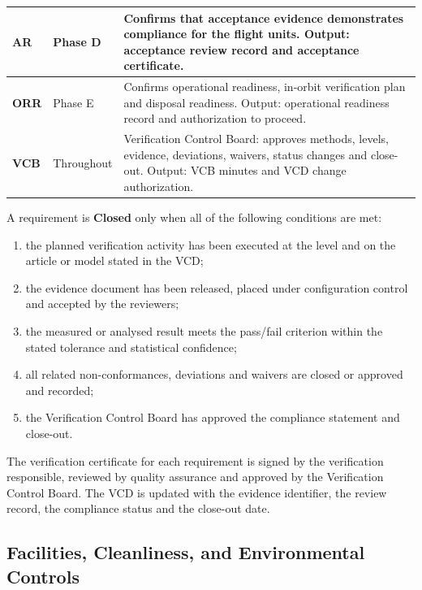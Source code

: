 \begin{table}[htbp]
{\begin{tabularx}{\textwidth}{|>{\raggedright\arraybackslash}p{2.35cm}|>{\raggedright\arraybackslash}p{2.1cm}|>{\raggedright\arraybackslash}X|}
\textbf{AR} & Phase D & Confirms that acceptance evidence demonstrates compliance for the flight units. Output: acceptance review record and acceptance certificate. \\ \hline
\textbf{ORR} & Phase E & Confirms operational readiness, in-orbit verification plan and disposal readiness. Output: operational readiness record and authorization to proceed. \\ \hline
\textbf{VCB} & Throughout & Verification Control Board: approves methods, levels, evidence, deviations, waivers, status changes and close-out. Output: VCB minutes and VCD change authorization. \\ \hline
\end{tabularx}}
\end{table}

A requirement is \textbf{Closed} only when all of the following conditions are met:
\begin{enumerate}
    \item the planned verification activity has been executed at the level and on the article or model stated in the VCD;
    \item the evidence document has been released, placed under configuration control and accepted by the reviewers;
    \item the measured or analysed result meets the pass/fail criterion within the stated tolerance and statistical confidence;
    \item all related non-conformances, deviations and waivers are closed or approved and recorded;
    \item the Verification Control Board has approved the compliance statement and close-out.
\end{enumerate}

The verification certificate for each requirement is signed by the verification responsible, reviewed by quality assurance and approved by the Verification Control Board. The VCD is updated with the evidence identifier, the review record, the compliance status and the close-out date.

\subsection{Facilities, Cleanliness, and Environmental Controls}

